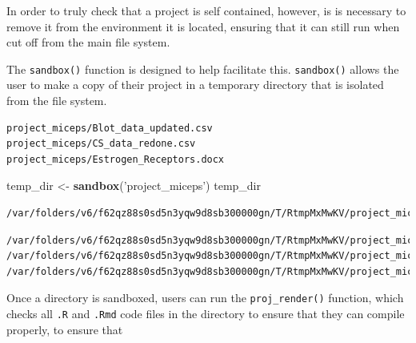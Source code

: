 \documentclass[12pt,twoside]{reedthesis}
\newenvironment{Shaded}{\begin{snugshade}}{\end{snugshade}}
\newcommand{\KeywordTok}[1]{\textcolor[rgb]{0.13,0.29,0.53}{\textbf{#1}}}
\newcommand{\DecValTok}[1]{\textcolor[rgb]{0.00,0.00,0.81}{#1}}
\newcommand{\StringTok}[1]{\textcolor[rgb]{0.31,0.60,0.02}{#1}}
\newcommand{\OperatorTok}[1]{\textcolor[rgb]{0.81,0.36,0.00}{\textbf{#1}}}
\newcommand{\NormalTok}[1]{#1}
\begin{document}
In order to truly check that a project is self contained, however, is is
necessary to remove it from the environment it is located, ensuring that
it can still run when cut off from the main file system.

The \texttt{sandbox()} function is designed to help facilitate this.
\texttt{sandbox()} allows the user to make a copy of their project in a
temporary directory that is isolated from the file system.
\begin{Shaded}
\end{Shaded}
\begin{verbatim}
project_miceps/Blot_data_updated.csv   project_miceps/CS_data_redone.csv      
project_miceps/Estrogen_Receptors.docx 
\end{verbatim}
\begin{Shaded}
\begin{Highlighting}[]
\NormalTok{temp_dir <-}\StringTok{ }\KeywordTok{sandbox}\NormalTok{(}\StringTok{'project_miceps'}\NormalTok{)}
\NormalTok{temp_dir}
\end{Highlighting}
\end{Shaded}
\begin{verbatim}
/var/folders/v6/f62qz88s0sd5n3yqw9d8sb300000gn/T/RtmpMxMwKV/project_miceps
\end{verbatim}
\begin{Shaded}
\end{Shaded}
\begin{verbatim}
/var/folders/v6/f62qz88s0sd5n3yqw9d8sb300000gn/T/RtmpMxMwKV/project_miceps/Blot_data_updated.csv
/var/folders/v6/f62qz88s0sd5n3yqw9d8sb300000gn/T/RtmpMxMwKV/project_miceps/CS_data_redone.csv
/var/folders/v6/f62qz88s0sd5n3yqw9d8sb300000gn/T/RtmpMxMwKV/project_miceps/Estrogen_Receptors.docx
\end{verbatim}
Once a directory is sandboxed, users can run the \texttt{proj\_render()}
function, which checks all \texttt{.R} and \texttt{.Rmd} code files in
the directory to ensure that they can compile properly, to ensure that
\end{document}
